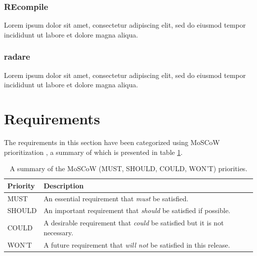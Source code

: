 \documentclass[12pt, a4paper]{article}
\begin{document}

\subsubsection{REcompile}

Lorem ipsum dolor sit amet, consectetur adipiscing elit, sed do eiusmod tempor incididunt ut labore et dolore magna aliqua.

\cite{recompile}


\subsubsection{radare}

Lorem ipsum dolor sit amet, consectetur adipiscing elit, sed do eiusmod tempor incididunt ut labore et dolore magna aliqua.

\cite{radare}



\section{Requirements}

The requirements in this section have been categorized using MoSCoW prioritization \cite{MoSCoW_analysis}, a summary of which is presented in table \ref{MoSCoW_priorities}.

\begin{table}[htbp]
	\begin{center}
		\begin{tabular}{|l|l|}
			\hline
			Priority & Description \\
			\hline
			MUST & An essential requirement that \textit{must} be satisfied. \\
			SHOULD & An important requirement that \textit{should} be satisfied if possible. \\
			COULD & A desirable requirement that \textit{could} be satisfied but it is not necessary. \\
			WON'T & A future requirement that \textit{will not} be satisfied in this release. \\
			\hline
		\end{tabular}
	\end{center}
	\caption{A summary of the MoSCoW (MUST, SHOULD, COULD, WON'T) priorities.}
	\label{MoSCoW_priorities}
\end{table}
\end{document}
